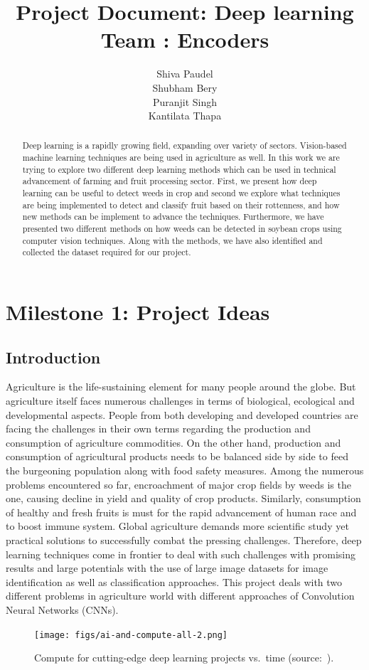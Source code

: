 \documentclass{report}
\title{Project Document: Deep learning \\ Team : Encoders}
\author{Shiva Paudel\\
Shubham Bery\\
Puranjit Singh\\
Kantilata Thapa\\
}
\date{}
\begin{document}
\maketitle

\tableofcontents

\begin{abstract}
Deep learning is a rapidly growing field, expanding over variety of sectors. Vision-based machine learning techniques are being used in agriculture as well. In this work we are trying to explore two different deep learning methods which can be used in technical advancement of farming and fruit processing sector. First, we present how deep learning can be useful to detect weeds in crop and second we explore what techniques are being implemented to detect and classify fruit based on their rottenness, and how new methods can be implement to advance the techniques. Furthermore, we have presented two different methods on how weeds can be detected in soybean crops using computer vision techniques. Along with the methods, we have also identified and collected the dataset required for our project.
\end{abstract}

\chapter{Milestone 1: Project Ideas}

\section{Introduction}
Agriculture is the life-sustaining element for many people around the globe. But agriculture itself faces numerous challenges in terms of biological, ecological and developmental aspects. People from both developing and developed countries are facing the challenges in their own terms regarding the production and consumption of agriculture commodities. On the other hand, production and consumption of agricultural products needs to be balanced side by side to feed the burgeoning population along with food safety measures. Among the numerous problems encountered so far, encroachment of major crop fields by weeds is the one, causing decline in yield and quality of crop products. Similarly, consumption of healthy and fresh fruits is must for the rapid advancement of human race and to boost immune system. Global agriculture demands more scientific study yet practical solutions to successfully combat the pressing challenges. Therefore, deep learning techniques come in frontier to deal with such challenges with promising results and large potentials with the use of large image datasets for image identification as well as classification approaches. This project deals with two different problems in agriculture world with different approaches of Convolution Neural Networks (CNNs).  
\iffalse
\begin{figure}
    \centering
    \texttt{[image: figs/ai-and-compute-all-2.png]}
    \caption{Compute for cutting-edge deep learning projects vs.\ time (source:~\cite{AI-compute18}).}
    \label{fig:compute}
\end{figure}
\end{document}
